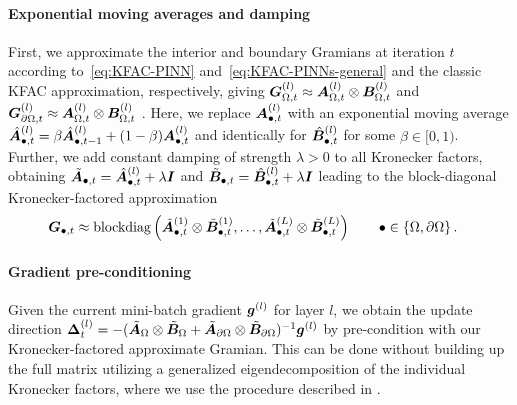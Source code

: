 \paragraph{Exponential moving averages and damping} %
First, we approximate the interior and boundary Gramians at iteration $t$  according to~\eqref{eq:KFAC-PINN} and~\eqref{eq:KFAC-PINNs-general} and the classic KFAC approximation, respectively, giving 
${\bm{G}}_{\Omega,t}^{(l)} \approx {\bm{A}}_{\Omega,t}^{(l)}\otimes {\bm{B}}_{\Omega,t}^{(l)}$ and ${\bm{G}}_{\partial \Omega, t}^{(l)}\approx {\bm{A}}_{\Omega,t}^{(l)}\otimes {\bm{B}}_{\Omega,t}^{(l)}$ . 
Here, we replace ${\bm{A}}^{(l)}_{\bullet,t}$ with an exponential moving average $\hat{{\bm{A}}}^{(l)}_{\bullet,t} = \beta \hat{{\bm{A}}}^{(l)}_{\bullet,t-1} + (1 - \beta) {\bm{A}}^{(l)}_{\bullet,t}$ 
and identically for $\hat{{\bm{B}}}^{(l)}_{\bullet, t}$ for some $\beta\in[0,1)$.
Further, we add constant damping of strength $\lambda>0$ to all Kronecker factors, obtaining $\tilde{{\bm{A}}}_{\bullet,t} = \hat{{\bm{A}}}^{(l)}_{\bullet,t} + \lambda {\bm{I}}$ and $\tilde{{\bm{B}}}_{\bullet,t} = \hat{{\bm{B}}}^{(l)}_{\bullet,t} + \lambda {\bm{I}}$
leading to the 
 block-diagonal Kronecker-factored approximation 
\begin{align*}
  {\bm{G}}_{\bullet, t}
  &\approx
    \operatorname{blockdiag}
    \left(
    \tilde{{\bm{A}}}^{(1)}_{\bullet,t} \otimes \tilde{{\bm{B}}}_{\bullet,t}^{(1)},
    \dots,
    \tilde{{\bm{A}}}^{(L)}_{\bullet,t} \otimes \tilde{{\bm{B}}}_{\bullet,t}^{(L)}
    \right)
    \qquad \bullet \in \{ \Omega, \partial\Omega\}\,.
\end{align*}

\paragraph{Gradient pre-conditioning%
}
Given the current mini-batch gradient ${\bm{g}}^{(l)}$ for layer $l$, we obtain the update direction ${\bm{\Delta}}_t^{(l)} = -(\tilde{{\bm{A}}}_{\Omega} \otimes \tilde{{\bm{B}}}_{\Omega} + \tilde{{\bm{A}}}_{\partial\Omega} \otimes \tilde{{\bm{B}}}_{\partial\Omega})^{-1} {\bm{g}}^{(l)}$ by 
pre-condition with our Kronecker-factored approximate Gramian.
This can be done without building up the full matrix utilizing a generalized eigendecomposition of the individual Kronecker factors, where we use the procedure described in \cite[Appendix I]{martens2015optimizing}. 


